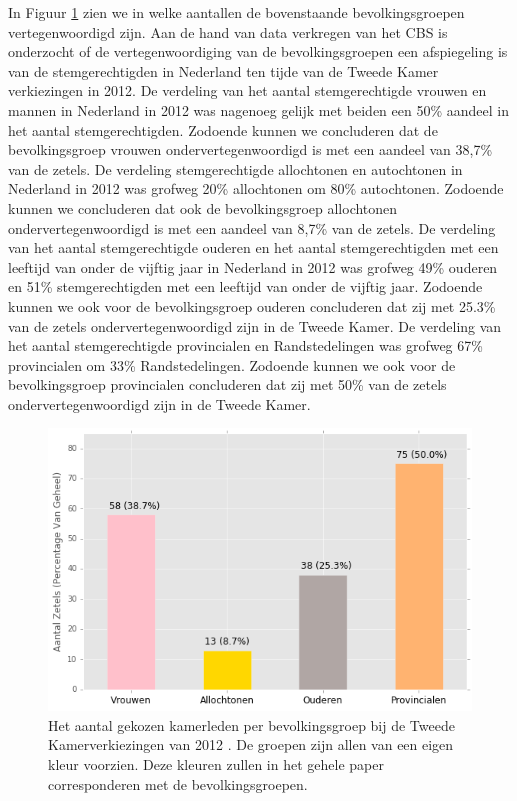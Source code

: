 In Figuur \ref{fig:az2012} zien we in welke aantallen de bovenstaande bevolkingsgroepen vertegenwoordigd zijn. Aan de hand van data verkregen van het CBS \citeyearpar{CBS_stemgedrag} is onderzocht of de vertegenwoordiging van de bevolkingsgroepen een afspiegeling is van de stemgerechtigden in Nederland ten tijde van de Tweede Kamer verkiezingen in 2012.
De verdeling van het aantal stemgerechtigde vrouwen en mannen in Nederland in 2012 was nagenoeg gelijk met beiden een 50\% aandeel in het aantal stemgerechtigden. Zodoende kunnen we concluderen dat de bevolkingsgroep vrouwen ondervertegenwoordigd is met een aandeel van 38,7\% van de zetels. 
De verdeling stemgerechtigde allochtonen en autochtonen in Nederland in 2012 was grofweg 20\% allochtonen om 80\% autochtonen. Zodoende kunnen we concluderen dat ook de bevolkingsgroep allochtonen ondervertegenwoordigd is met een aandeel van 8,7\% van de zetels. 
De verdeling van het aantal stemgerechtigde ouderen en het aantal stemgerechtigden met een leeftijd van onder de vijftig jaar in Nederland in 2012 was grofweg 49\% ouderen en 51\% stemgerechtigden met een leeftijd van onder de vijftig jaar. Zodoende kunnen we ook voor de bevolkingsgroep ouderen concluderen dat zij met 25.3\% van de zetels ondervertegenwoordigd zijn in de Tweede Kamer. 
De verdeling van het aantal stemgerechtigde provincialen en Randstedelingen was grofweg 67\% provincialen om 33\% Randstedelingen. Zodoende kunnen we ook voor de bevolkingsgroep provincialen concluderen dat zij met 50\% van de zetels ondervertegenwoordigd zijn in de Tweede Kamer. 

\begin{figure}[H]
\centering

	\includegraphics[width=0.55\linewidth]{aantal_zetels_bevolkingsgroepen.png}

			\caption{Het aantal gekozen kamerleden per bevolkingsgroep bij de Tweede Kamerverkiezingen van 2012 \citep{Kiesraad_uitslag}. De groepen zijn allen van een eigen kleur voorzien. Deze kleuren zullen in het gehele paper corresponderen met de bevolkingsgroepen.}

\label{fig:az2012}
\end{figure}

